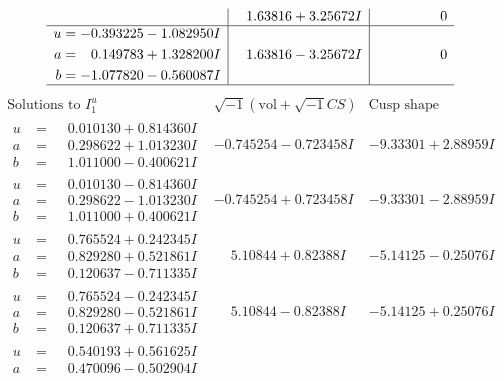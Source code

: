 \documentclass[1p]{elsarticle_modified}
\theoremstyle{definition}
\newcommand{\I}{\sqrt{-1}}
\begin{document}
$$\begin{array}{c|c|c}
 & \phantom{-}1.63816 + 3.25672 I & \phantom{-0.000000 } 0 \\ \hline\begin{aligned}
u &= -0.393225 - 1.082950 I \\
a &= \phantom{-}0.149783 + 1.328200 I \\
b &= -1.077820 - 0.560087 I\end{aligned}
 & \phantom{-}1.63816 - 3.25672 I & \phantom{-0.000000 } 0\\
 \hline 
 \end{array}$$\newpage$$\begin{array}{c|c|c}  
\text{Solutions to }I^u_{1}& \I (\text{vol} + \sqrt{-1}CS) & \text{Cusp shape}\\
 \hline 
\begin{aligned}
u &= \phantom{-}0.010130 + 0.814360 I \\
a &= \phantom{-}0.298622 + 1.013230 I \\
b &= \phantom{-}1.011000 - 0.400621 I\end{aligned}
 & -0.745254 - 0.723458 I & -9.33301 + 2.88959 I \\ \hline\begin{aligned}
u &= \phantom{-}0.010130 - 0.814360 I \\
a &= \phantom{-}0.298622 - 1.013230 I \\
b &= \phantom{-}1.011000 + 0.400621 I\end{aligned}
 & -0.745254 + 0.723458 I & -9.33301 - 2.88959 I \\ \hline\begin{aligned}
u &= \phantom{-}0.765524 + 0.242345 I \\
a &= \phantom{-}0.829280 + 0.521861 I \\
b &= \phantom{-}0.120637 - 0.711335 I\end{aligned}
 & \phantom{-}5.10844 + 0.82388 I & -5.14125 - 0.25076 I \\ \hline\begin{aligned}
u &= \phantom{-}0.765524 - 0.242345 I \\
a &= \phantom{-}0.829280 - 0.521861 I \\
b &= \phantom{-}0.120637 + 0.711335 I\end{aligned}
 & \phantom{-}5.10844 - 0.82388 I & -5.14125 + 0.25076 I \\ \hline\begin{aligned}
u &= \phantom{-}0.540193 + 0.561625 I \\
a &= \phantom{-}0.470096 - 0.502904 I \\

\end{aligned}
\end{array}$$
\end{document}
